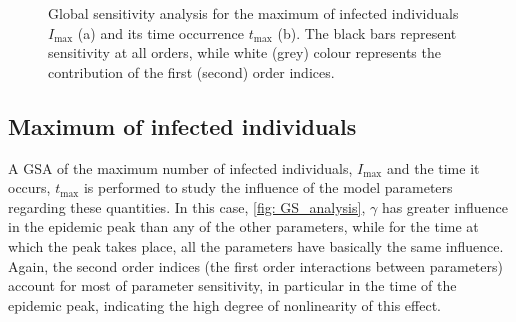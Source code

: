 \begin{figure}[H]
    \centering
    \caption{Global sensitivity analysis for the maximum of infected
        individuals $I_{\textrm{max}}$ (a) and its time occurrence
        $t_{\textrm{max}}$
        (b). The black bars represent sensitivity at all orders,
        while white (grey) colour represents the contribution of the first
        (second) order indices.}
    \label{fig: GS_analysis}
\end{figure}

\subsection{Maximum of infected individuals}

A GSA of the maximum number of infected individuals, $I_{\textrm{max}}$ and
the time it occurs, $t_{\textrm{max}}$ is performed to study the influence of
the model parameters regarding these quantities. In this case, \cref{fig:
    GS_analysis}, $\gamma$ has greater influence in the epidemic peak than any
of
the other parameters, while for the time at which the peak takes place, all the
parameters have basically the same influence. Again, the second order indices
(the first order interactions between parameters) account for most of parameter
sensitivity, in particular in the time of the epidemic peak, indicating the
high degree of nonlinearity of this effect.

